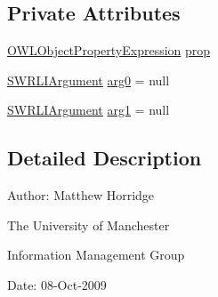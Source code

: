 \subsection*{Private Attributes}
\begin{DoxyCompactItemize}
\item 
\hyperlink{interfaceorg_1_1semanticweb_1_1owlapi_1_1model_1_1_o_w_l_object_property_expression}{O\-W\-L\-Object\-Property\-Expression} \hyperlink{classorg_1_1coode_1_1owlapi_1_1owlxmlparser_1_1_s_w_r_l_object_property_atom_element_handler_a5273ccaabeaf08ac1299fe39c29f49e3}{prop}
\item 
\hyperlink{interfaceorg_1_1semanticweb_1_1owlapi_1_1model_1_1_s_w_r_l_i_argument}{S\-W\-R\-L\-I\-Argument} \hyperlink{classorg_1_1coode_1_1owlapi_1_1owlxmlparser_1_1_s_w_r_l_object_property_atom_element_handler_a7e21febdb8413a601ea5cce761f05765}{arg0} = null
\item 
\hyperlink{interfaceorg_1_1semanticweb_1_1owlapi_1_1model_1_1_s_w_r_l_i_argument}{S\-W\-R\-L\-I\-Argument} \hyperlink{classorg_1_1coode_1_1owlapi_1_1owlxmlparser_1_1_s_w_r_l_object_property_atom_element_handler_ae940e8294ae91df8a5bcbe97ecb8669d}{arg1} = null
\end{DoxyCompactItemize}


\subsection{Detailed Description}
Author\-: Matthew Horridge\par
 The University of Manchester\par
 Information Management Group\par
 Date\-: 08-\/\-Oct-\/2009 

